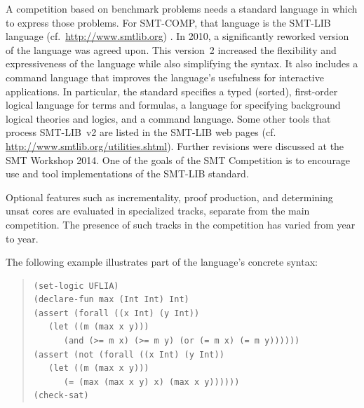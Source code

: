\documentclass[twoside,11pt]{article}
\begin{document}
A competition based on benchmark problems needs a standard language in which to express those problems.
For SMT-COMP, that language is the SMT-LIB language (cf.~\url{http://www.smtlib.org}) \cite{BarST-RR-10,BarST-SMT-10,Cok-SMTLIBTutorial-2011}.
In 2010, a significantly reworked version of the language was agreed upon.
This version~2 increased the flexibility and expressiveness of the language while also simplifying the syntax.
It also includes a command language that improves the language's usefulness for interactive applications.
In particular, the standard specifies a typed (sorted), first-order logical language for terms and formulas, a language for specifying background logical theories and logics, and a command language. Some other tools that process SMT-LIB~v2 are listed in the SMT-LIB web pages (cf. \url{http://www.smtlib.org/utilities.shtml}). Further revisions were discussed at the SMT Workshop 2014. One of the goals of the SMT Competition is to encourage use and tool implementations of the SMT-LIB standard.

Optional features such as incrementality, proof production, and determining unsat cores are evaluated in specialized tracks, separate from the main competition. The presence of such tracks in the competition has varied from year to year.
  
The following example illustrates part of the language's concrete syntax:

\begin{minipage}{\textwidth}
\begin{quote}
\lstset{frameround=fttt}
\begin{lstlisting}[frame=trBL]
(set-logic UFLIA)
(declare-fun max (Int Int) Int)
(assert (forall ((x Int) (y Int))
   (let ((m (max x y)))
      (and (>= m x) (>= m y) (or (= m x) (= m y))))))
(assert (not (forall ((x Int) (y Int))
   (let ((m (max x y)))
      (= (max (max x y) x) (max x y))))))
(check-sat)
\end{lstlisting}
\end{quote}
\end{minipage}
\end{document}
